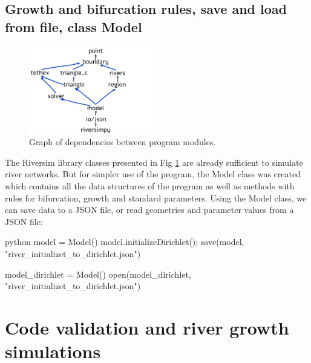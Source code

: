 \documentclass[]{pracamgr}
\begin{document}
    \section{Growth and bifurcation rules, save and load from file, class Model}
      \begin{figure}[H]
        \centering
        \includegraphics[width=0.5\textwidth]{figs/program_dependecy_graph.jpg}        
        \caption{Graph of dependencies between program modules.}
        \label{program_strucutre}
      \end{figure}

    The Riversim library classes presented in Fig \ref{program_strucutre} are already sufficient to simulate river networks. But for simpler use of the program, the Model class was created which contains all the data structures of the program as well as methods with rules for bifurcation, growth and standard parameters. Using the Model class, we can save data to a JSON file, or read geometries and parameter values from a JSON file:

    \begin{mintedbox}{python}
      model = Model()
      model.initializeDirichlet();
      save(model, "river_initializet_to_dirichlet.json")
      
      model_dirichlet = Model()
      open(model_dirichlet, "river_initializet_to_dirichlet.json")\end{mintedbox}


  \chapter{Code validation and river growth simulations}
\end{document}
